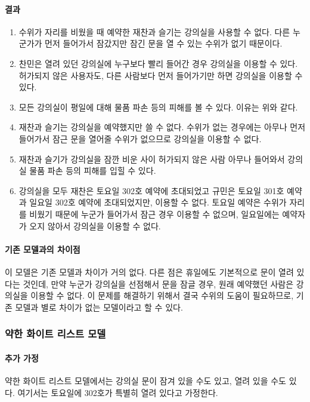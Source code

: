 \documentclass[11pt,a4paper]{article}
\begin{document}
\paragraph{결과}
\begin{enumerate}
\item 수위가 자리를 비웠을 때 예약한 재찬과 슬기는 강의실을 사용할 수 없다. 다른 누군가가 먼저 들어가서 잠갔지만 잠긴 문을 열 수 있는 수위가 없기 때문이다.
\item 찬민은 열려 있던 강의실에 누구보다 빨리 들어간 경우 강의실을 이용할 수 있다. 허가되지 않은 사용자도, 다른 사람보다 먼저 들어가기만 하면 강의실을 이용할 수 있다.
\item 모든 강의실이 평일에 대해 물품 파손 등의 피해를 볼 수 있다. 이유는 위와 같다.
\item 재찬과 슬기는 강의실을 예약했지만 쓸 수 없다. 수위가 없는 경우에는 아무나 먼저 들어가서 잠근 문을 열어줄 수위가 없으므로 강의실을 이용할 수 없다.
\item 재찬과 슬기가 강의실을 잠깐 비운 사이 허가되지 않은 사람 아무나 들어와서 강의실 물품 파손 등의 피해를 입힐 수 있다.
\item 강의실을 모두 재찬은 토요일 302호 예약에 초대되었고 규민은 토요일 301호 예약과 일요일 302호 예약에 초대되었지만, 이용할 수 없다. 토요일 예약은 수위가 자리를 비웠기 때문에 누군가 들어가서 잠근 경우 이용할 수 없으며, 일요일에는 예약자가 오지 않아서 강의실을 이용할 수 없다.
\end{enumerate}

\paragraph{기존 모델과의 차이점}
\hfill\break
이 모델은 기존 모델과 차이가 거의 없다. 다른 점은 휴일에도 기본적으로 문이 열려
있다는 것인데, 만약 누군가 강의실을 선점해서 문을 잠글 경우, 원래 예약했던
사람은 강의실을 이용할 수 없다. 이 문제를 해결하기 위해서 결국 수위의 도움이
필요하므로, 기존 모델과 별로 차이가 없는 모델이라고 할 수 있다.

\subsubsection{약한 화이트 리스트 모델}

\paragraph{추가 가정}
약한 화이트 리스트 모델에서는 강의실 문이 잠겨 있을 수도 있고, 열려 있을 수도 있다. 여기서는 토요일에 302호가 특별히 열려 있다고 가정한다.
\end{document}

